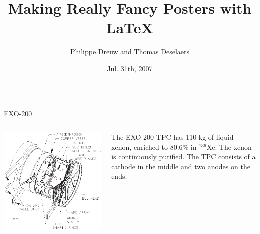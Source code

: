 \documentclass[final]{beamer} %
\title[Fancy Posters]{Making Really Fancy Posters with \LaTeX}
\author[Dreuw \& Deselaers]{Philippe Dreuw and Thomas Deselaers}
\institute[RWTH Aachen University]{Human Language Technology and Pattern Recognition,RWTH Aachen University}
\date{Jul. 31th, 2007}
\begin{document}
  \begin{frame}{} 
  \begin{columns}[t]


  \begin{column}{.3\linewidth}

    \begin{block}{\large EXO-200}

      \begin{columns}
        \begin{column}{0.49\linewidth}
          \includegraphics[keepaspectratio=true,width=\textwidth]{TPCSchematic.eps}
        \end{column}
        \begin{column}{0.49\linewidth}
          The EXO-200 TPC has 110 kg of liquid xenon, enriched to 80.6\% in $^{136}$Xe.  The xenon is continuously purified.  The TPC consists of a cathode in the middle and two anodes on the ends.
        \end{column}
      \end{columns}


\end{block}
\end{column}
\end{columns}
\end{frame}
\end{document}
